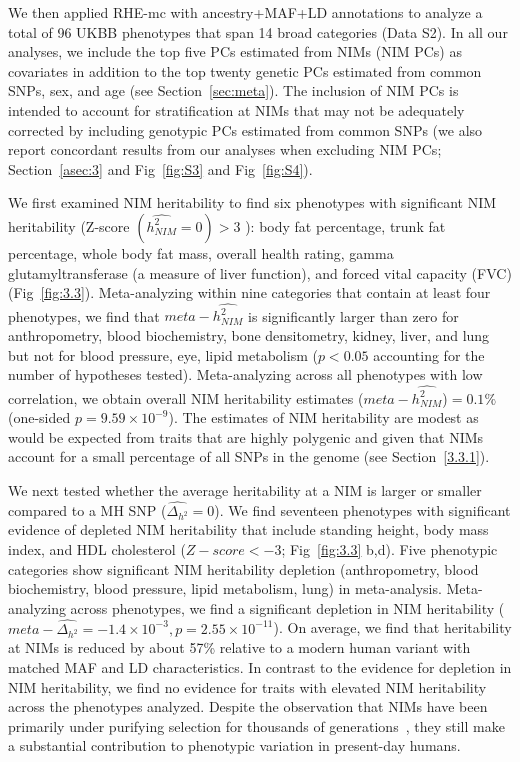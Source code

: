 We then applied RHE-mc with ancestry+MAF+LD annotations to analyze a total of 96 UKBB phenotypes that span 14 broad categories (Data S2). In all our analyses, we include the top five PCs estimated from NIMs (NIM PCs) as covariates in addition to the top twenty genetic PCs estimated from common SNPs, sex, and age (see Section~\ref{sec:meta}). The inclusion of NIM PCs is intended to account for stratification at NIMs that may not be adequately corrected by including genotypic PCs estimated from common SNPs (we also report concordant results from our analyses when excluding NIM PCs; Section~\ref{asec:3} and Fig~\ref{fig:S3} and Fig~\ref{fig:S4}).

We first examined NIM heritability to find six phenotypes with significant NIM heritability (Z-score $(\hat{h^2_{NIM}}=0)>3$ ): body fat percentage, trunk fat percentage, whole body fat mass, overall health rating, gamma glutamyltransferase (a measure of liver function), and forced vital capacity (FVC) (Fig~\ref{fig:3.3}). Meta-analyzing within nine categories that contain at least four phenotypes, we find that $meta-\hat{h^2_{NIM}}$ is significantly larger than zero for anthropometry, blood biochemistry, bone densitometry, kidney, liver, and lung but not for blood pressure, eye, lipid metabolism ($p < 0.05$ accounting for the number of hypotheses tested).  Meta-analyzing across all phenotypes with low correlation, we obtain overall NIM heritability estimates ($meta -\hat{h^2_{NIM}}$)$=0.1\%$ (one-sided $p=9.59\times10^{-9}$). The estimates of NIM heritability are modest as would be expected from traits that are highly polygenic and given that NIMs account for a small percentage of all SNPs in the genome (see Section~\ref{3.3.1}). 

We next tested whether the average heritability at a NIM is larger or smaller compared to a MH SNP ($\hat{\Delta_{h^2}}=0$). We find seventeen phenotypes with significant evidence of depleted NIM heritability that include standing height, body mass index, and HDL cholesterol ($Z-score < -3$; {Fig~\ref{fig:3.3} b,d}). Five phenotypic categories show significant NIM heritability depletion (anthropometry, blood biochemistry, blood pressure, lipid metabolism, lung) in meta-analysis. Meta-analyzing across phenotypes, we find a significant depletion in NIM heritability ($meta-\hat{\Delta_{h^2}} = -1.4\times10^{-3}, p= 2.55\times 10^{-11}$). On average, we find that heritability at NIMs is reduced by about 57\% relative to a modern human variant with matched MAF and LD characteristics. In contrast to the evidence for depletion in NIM heritability, we find no evidence for traits with elevated NIM heritability across the phenotypes analyzed. Despite the observation that NIMs have been primarily under purifying selection for thousands of generations~\cite{harris2016genetic,petr2019limits}, they still make a substantial contribution to phenotypic variation in present-day humans. 
  
